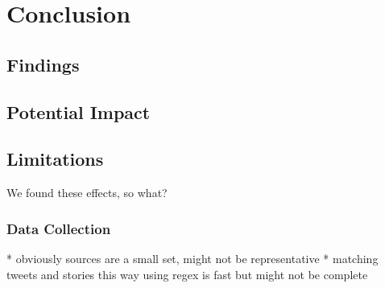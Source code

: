 \chapter{Conclusion}

\section{Findings}

\section{Potential Impact}

\section{Limitations}
We found these effects, so what?
 
\subsection{Data Collection}
* obviously sources are a small set, might not be representative
* matching tweets and stories this way using regex is fast but might not be complete

 




